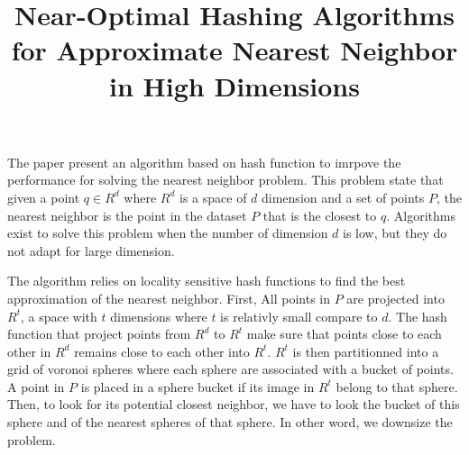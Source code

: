 \documentclass{article}
\title{Near-Optimal Hashing Algorithms for Approximate Nearest Neighbor in High Dimensions}
\begin{document}
\maketitle
The paper present an algorithm based on hash function to imrpove the performance for solving the nearest neighbor problem.
This problem state that given a point $q \in R^d$ where $R^d$ is a space of $d$ dimension and a set of points $P$, the nearest neighbor
is the point in the dataset $P$ that is the closest to $q$.
Algorithms exist to solve this problem when the number of dimension $d$ is low, but they do not adapt for large dimension.

The algorithm relies on locality sensitive hash functions to find the best approximation of the nearest neighbor.
First, All points in $P$ are projected into $R^t$, a space with $t$ dimensions where $t$ is relativly small compare to $d$.
The hash function that project points from $R^d$ to $R^t$ make sure that points close to each other in $R^d$ remains close
to each other into $R^t$.
$R^t$ is then partitionned into a grid of voronoi spheres where each sphere are associated with a bucket of points.
A point in $P$ is placed in a sphere bucket if its image in $R^t$ belong to that sphere.
Then, to look for its potential closest neighbor, we have to look the bucket of this sphere and of the nearest spheres of that sphere.
In other word, we downsize the problem.
\end{document}
